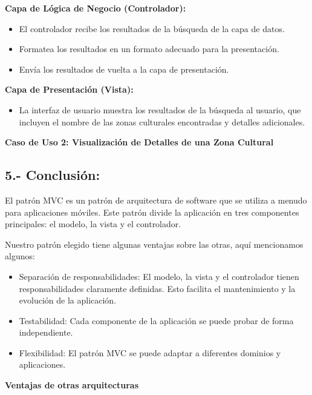 \textbf{Capa de Lógica de Negocio (Controlador):}
\begin{itemize}
	\item El controlador recibe los resultados de la búsqueda de la capa de datos.
	\item Formatea los resultados en un formato adecuado para la presentación.
	\item Envía los resultados de vuelta a la capa de presentación.
\end{itemize}

\textbf{Capa de Presentación (Vista):}
\begin{itemize}
	\item La interfaz de usuario muestra los resultados de la búsqueda al usuario, que incluyen el nombre de las zonas culturales encontradas y detalles adicionales.
\end{itemize}

\textbf{Caso de Uso 2: Visualización de Detalles de una Zona Cultural}

\subsection*{5.- Conclusión:}

El patrón MVC es un patrón de arquitectura de software que se utiliza a menudo para aplicaciones móviles. Este patrón divide la aplicación en tres componentes principales: el modelo, la vista y el controlador.

Nuestro patrón elegido tiene algunas ventajas sobre las otras, aquí mencionamos algunos:
\begin{itemize}
	\item Separación de responsabilidades: El modelo, la vista y el controlador tienen responsabilidades claramente definidas. Esto facilita el mantenimiento y la evolución de la aplicación.
	\item Testabilidad: Cada componente de la aplicación se puede probar de forma independiente.
	\item Flexibilidad: El patrón MVC se puede adaptar a diferentes dominios y aplicaciones.
\end{itemize}

\textbf{Ventajas de otras arquitecturas}

